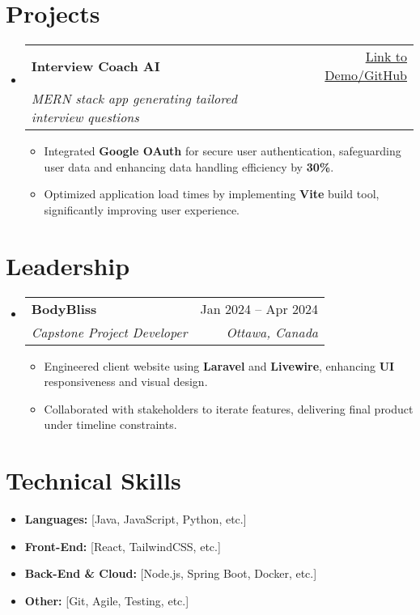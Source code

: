 \documentclass[letterpaper,11pt]{article}
\makeatletter
\newcommand{\resumeItem}[1]{\item\small{#1 \vspace{-2pt}}}
\newcommand{\resumeSubheading}[4]{
  \vspace{-1pt}\item
    \begin{tabular*}{0.97\textwidth}[t]{l@{\extracolsep{\fill}}r}
      \textbf{#1} & #2 \\
      \textit{\small#3} & \textit{\small #4} \\
    \end{tabular*}\vspace{-5pt}
}
\newcommand{\resumeSubHeadingListStart}{\begin{itemize}[leftmargin=*]}
\newcommand{\resumeSubHeadingListEnd}{\end{itemize}}
\newcommand{\resumeItemListStart}{\begin{itemize}}
\newcommand{\resumeItemListEnd}{\end{itemize}\vspace{-5pt}}
\makeatother
\begin{document}
\section{Projects}
  \resumeSubHeadingListStart
    \resumeSubheading
      {\textbf{Interview Coach AI}}{\href{https://interviewcoach-ai.vercel.app/}{Link to Demo/GitHub}}
      {MERN stack app generating tailored interview questions}{} 
      \resumeItemListStart
        \resumeItem{Integrated \textbf{Google OAuth} for secure user authentication, safeguarding user data and enhancing data handling efficiency by \textbf{30\%}.}
        \resumeItem{Optimized application load times by implementing \textbf{Vite} build tool, significantly improving user experience.}
      \resumeItemListEnd
  \resumeSubHeadingListEnd

\section{Leadership}
  \resumeSubHeadingListStart
    \resumeSubheading
      {BodyBliss}{Jan 2024 -- Apr 2024}
      {Capstone Project Developer}{Ottawa, Canada}
      \resumeItemListStart
        \resumeItem{Engineered client website using \textbf{Laravel} and \textbf{Livewire}, enhancing \textbf{UI} responsiveness and visual design.}
        \resumeItem{Collaborated with stakeholders to iterate features, delivering final product under timeline constraints.}
      \resumeItemListEnd
  \resumeSubHeadingListEnd

\section{Technical Skills}
  \resumeItemListStart
    \resumeItem{\textbf{Languages:} [Java, JavaScript, Python, etc.]}
    \resumeItem{\textbf{Front-End:} [React, TailwindCSS, etc.]}
    \resumeItem{\textbf{Back-End \& Cloud:} [Node.js, Spring Boot, Docker, etc.]}
    \resumeItem{\textbf{Other:} [Git, Agile, Testing, etc.]}
  \resumeItemListEnd

\end{document}
